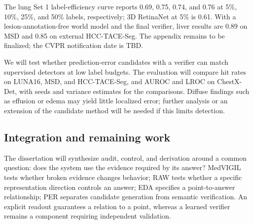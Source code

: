 The lung Set 1 label-efficiency curve reports 0.69, 0.75, 0.74, and 0.76 at 5\%, 10\%, 25\%, and 50\% labels, respectively; 3D RetinaNet at 5\% is 0.61. With a lesion-annotation-free world model and the final verifier, liver results are 0.89 on MSD and 0.85 on external HCC-TACE-Seg. The appendix remains to be finalized; the CVPR notification date is TBD.

We will test whether prediction-error candidates with a verifier can match supervised detectors at low label budgets. The evaluation will compare hit rates on LUNA16, MSD, and HCC-TACE-Seg, and AUROC and LROC on ChestX-Det, with seeds and variance estimates for the comparisons. Diffuse findings such as effusion or edema may yield little localized error; further analysis or an extension of the candidate method will be needed if this limits detection.

\subsection{Integration and remaining work}
The dissertation will synthesize audit, control, and derivation around a common question: does the system use the evidence required by its answer? MedVIGIL tests whether broken evidence changes behavior; RAW tests whether a specific representation direction controls an answer; EDA specifies a point-to-answer relationship; PER separates candidate generation from semantic verification. An explicit readout guarantees a relation to a point, whereas a learned verifier remains a component requiring independent validation.

